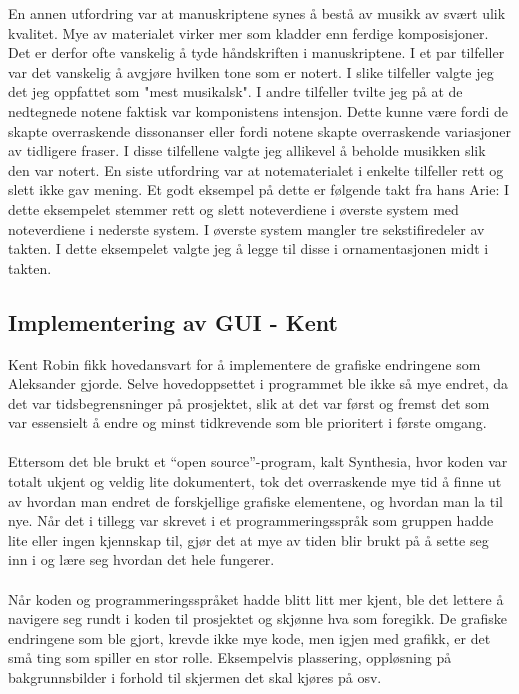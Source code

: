 En annen utfordring var at manuskriptene synes å bestå av musikk av svært ulik kvalitet. Mye av materialet virker mer som kladder enn ferdige komposisjoner. Det er derfor ofte vanskelig å tyde håndskriften i manuskriptene. I et par tilfeller var det vanskelig å avgjøre hvilken tone som er notert. I slike tilfeller valgte jeg det jeg oppfattet som "mest musikalsk". I andre tilfeller tvilte jeg på at de nedtegnede notene faktisk var komponistens intensjon. Dette kunne være fordi de skapte overraskende dissonanser eller fordi notene skapte overraskende variasjoner av tidligere fraser. I disse tilfellene valgte jeg allikevel å beholde musikken slik den var notert. En siste utfordring var at notematerialet i enkelte tilfeller rett og slett ikke gav mening. Et godt eksempel på dette er følgende takt fra hans Arie:  
I dette eksempelet stemmer rett og slett noteverdiene i øverste system med noteverdiene i nederste system. I øverste system mangler tre sekstifiredeler av takten. I dette eksempelet valgte jeg å legge til disse i ornamentasjonen midt i takten.  

\subsection{Implementering av GUI - Kent}
Kent Robin fikk hovedansvart for å implementere de grafiske endringene som Aleksander gjorde. Selve hovedoppsettet i programmet ble ikke så mye endret, da det var tidsbegrensninger på prosjektet, slik at det var først og fremst det som var essensielt å endre og minst tidkrevende som ble prioritert i første omgang.
\\\\
Ettersom det ble brukt et “open source”-program, kalt Synthesia, hvor koden var totalt ukjent og veldig lite dokumentert, tok det overraskende mye tid å finne ut av hvordan man endret de forskjellige grafiske elementene, og hvordan man la til nye. Når det i tillegg var skrevet i et programmeringsspråk som gruppen hadde lite eller ingen kjennskap til, gjør det at mye av tiden blir brukt på å sette seg inn i og lære seg hvordan det hele fungerer. 
\\\\
Når koden og programmeringsspråket hadde blitt litt mer kjent, ble det lettere å navigere seg rundt i koden til prosjektet og skjønne hva som foregikk. De grafiske endringene som ble gjort, krevde ikke mye kode, men igjen med grafikk, er det små ting som spiller en stor rolle. Eksempelvis plassering, oppløsning på bakgrunnsbilder i forhold til skjermen det skal kjøres på osv. 

